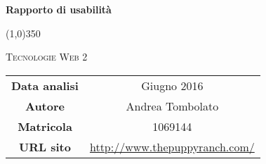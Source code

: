 \documentclass{article}
\author{Andrea Tombolato}
\date{Giugno 2016}
\begin{document}
	\begin{titlepage}
		\centering
	{\huge\bfseries Rapporto di usabilità \par}

	\line(1,0){350} \\
	{\scshape\LARGE Tecnologie Web 2 \par}
	\vspace{2cm}
	\begin{tabular}{c|c}
		{\hfill\textbf{Data analisi}} 		& Giugno 2016  		\\ 
		{\hfill\textbf{Autore}} 		& Andrea Tombolato \\
		{\hfill\textbf{Matricola}} 		& 1069144  		\\ 
		{\hfill\textbf{URL sito}} 			& \url{http://www.thepuppyranch.com/} \\ 
	\end{tabular}
	\end{titlepage}
\newpage
	\pagestyle{myfrontrel}
	\tableofcontents
	\label{LastFrontPage}
\newpage
	\pagestyle{myrel}
	
\newpage
	
\newpage
	
\newpage
	

\label{LastPage}
\end{document}
